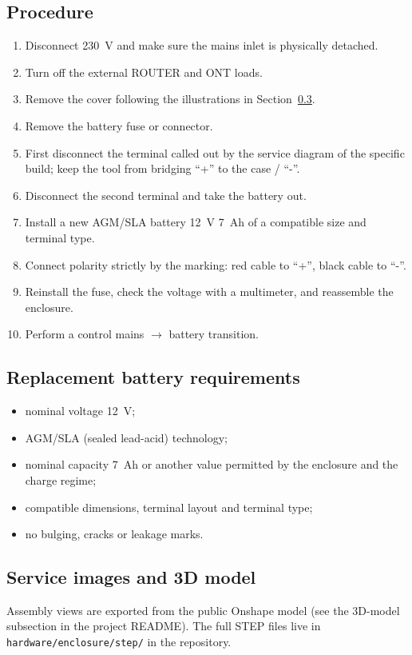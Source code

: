 \documentclass[11pt,a4paper]{article}
\begin{document}
\subsection{Procedure}
\begin{enumerate}[leftmargin=8mm]
  \item Disconnect 230~V and make sure the mains inlet is physically detached.
  \item Turn off the external ROUTER and ONT loads.
  \item Remove the cover following the illustrations in Section~\ref{sec:figures}.
  \item Remove the battery fuse or connector.
  \item First disconnect the terminal called out by the service diagram of the specific build; keep the tool from bridging ``+'' to the case / ``-''.
  \item Disconnect the second terminal and take the battery out.
  \item Install a new AGM/SLA battery 12~V 7~Ah of a compatible size and terminal type.
  \item Connect polarity strictly by the marking: red cable to ``+'', black cable to ``-''.
  \item Reinstall the fuse, check the voltage with a multimeter, and reassemble the enclosure.
  \item Perform a control mains $\rightarrow$ battery transition.
\end{enumerate}

\subsection{Replacement battery requirements}
\begin{itemize}[leftmargin=7mm]
  \item nominal voltage 12~V;
  \item AGM/SLA (sealed lead-acid) technology;
  \item nominal capacity 7~Ah or another value permitted by the enclosure and the charge regime;
  \item compatible dimensions, terminal layout and terminal type;
  \item no bulging, cracks or leakage marks.
\end{itemize}

\subsection{Service images and 3D model}\label{sec:figures}
Assembly views are exported from the public Onshape model (see the 3D-model subsection in the project README). The full STEP files live in \texttt{hardware/enclosure/step/} in the repository.
\end{document}
